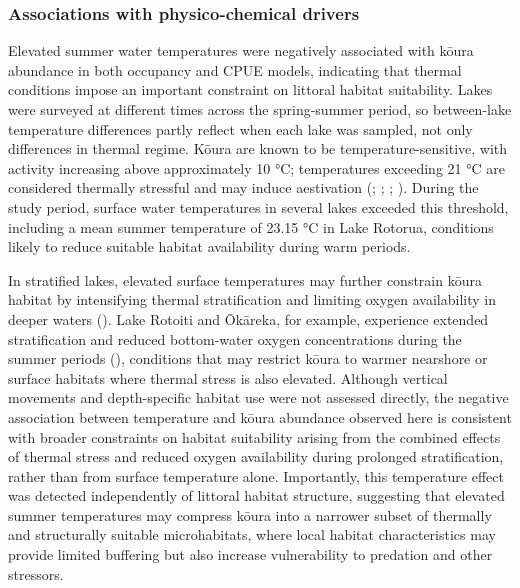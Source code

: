 \documentclass[
  letterpaper,
  DIV=11,
  numbers=noendperiod]{scrartcl}
\begin{document}
\subsubsection{Associations with physico-chemical
drivers}\label{associations-with-physico-chemical-drivers}

Elevated summer water temperatures were negatively associated with kōura
abundance in both occupancy and CPUE models, indicating that thermal
conditions impose an important constraint on littoral habitat
suitability. Lakes were surveyed at different times across the
spring-summer period, so between-lake temperature differences partly
reflect when each lake was sampled, not only differences in thermal
regime. Kōura are known to be temperature-sensitive, with activity
increasing above approximately 10 °C; temperatures exceeding 21 °C are
considered thermally stressful and may induce aestivation
(;
;
;
). During the study period,
surface water temperatures in several lakes exceeded this threshold,
including a mean summer temperature of 23.15 °C in Lake Rotorua,
conditions likely to reduce suitable habitat availability during warm
periods.

In stratified lakes, elevated surface temperatures may further constrain
kōura habitat by intensifying thermal stratification and limiting oxygen
availability in deeper waters ().
Lake Rotoiti and Ōkāreka, for example, experience extended
stratification and reduced bottom-water oxygen concentrations during the
summer periods (), conditions that may restrict kōura to warmer nearshore or
surface habitats where thermal stress is also elevated. Although
vertical movements and depth-specific habitat use were not assessed
directly, the negative association between temperature and kōura
abundance observed here is consistent with broader constraints on
habitat suitability arising from the combined effects of thermal stress
and reduced oxygen availability during prolonged stratification, rather
than from surface temperature alone. Importantly, this temperature
effect was detected independently of littoral habitat structure,
suggesting that elevated summer temperatures may compress kōura into a
narrower subset of thermally and structurally suitable microhabitats,
where local habitat characteristics may provide limited buffering but
also increase vulnerability to predation and other stressors.
\end{document}
